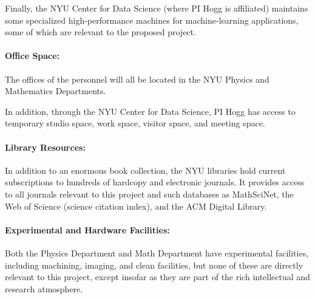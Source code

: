 Finally, the NYU Center for Data Science (where PI Hogg is affiliated)
maintains some specialized high-performance machines for machine-learning
applications, some of which are relevant to the proposed project.

\paragraph{Office Space:}

The offices of the personnel will all be located in the NYU Physics and Mathematics Departments.

In addition, through the NYU Center for Data Science, PI Hogg has access to temporary studio space, work space, visitor space, and meeting space.

\paragraph{Library Resources:}

In addition to an enormous book collection, the NYU libraries hold
current subscriptions to hundreds of hardcopy and electronic journals.
It provides access to all journals relevant to this project and such
databases as MathSciNet, the Web of Science (science citation index),
and the ACM Digital Library.

\paragraph{Experimental and Hardware Facilities:}

Both the Physics Department and Math Department have experimental facilities, including machining, imaging, and clean facilities, but none of these are directly relevant to this project, except insofar as they are part of the rich intellectual and research atmosphere.
